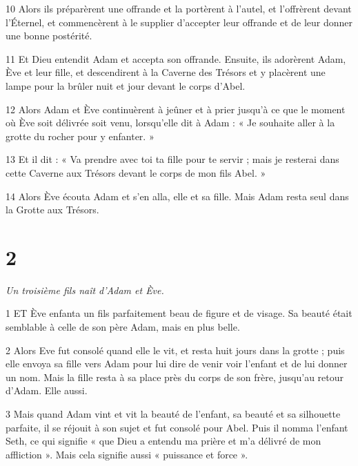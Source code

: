 \par 10 Alors ils préparèrent une offrande et la portèrent à l'autel, et l'offrèrent devant l'Éternel, et commencèrent à le supplier d'accepter leur offrande et de leur donner une bonne postérité.

\par 11 Et Dieu entendit Adam et accepta son offrande. Ensuite, ils adorèrent Adam, Ève et leur fille, et descendirent à la Caverne des Trésors et y placèrent une lampe pour la brûler nuit et jour devant le corps d'Abel.

\par 12 Alors Adam et Ève continuèrent à jeûner et à prier jusqu'à ce que le moment où Ève soit délivrée soit venu, lorsqu'elle dit à Adam : « Je souhaite aller à la grotte du rocher pour y enfanter. »

\par 13 Et il dit : « Va prendre avec toi ta fille pour te servir ; mais je resterai dans cette Caverne aux Trésors devant le corps de mon fils Abel. »

\par 14 Alors Ève écouta Adam et s'en alla, elle et sa fille. Mais Adam resta seul dans la Grotte aux Trésors.

\chapter{2}

\par \textit{Un troisième fils naît d'Adam et Ève.}

\par 1 ET Ève enfanta un fils parfaitement beau de figure et de visage. Sa beauté était semblable à celle de son père Adam, mais en plus belle.

\par 2 Alors Eve fut consolé quand elle le vit, et resta huit jours dans la grotte ; puis elle envoya sa fille vers Adam pour lui dire de venir voir l'enfant et de lui donner un nom. Mais la fille resta à sa place près du corps de son frère, jusqu'au retour d'Adam. Elle aussi.

\par 3 Mais quand Adam vint et vit la beauté de l'enfant, sa beauté et sa silhouette parfaite, il se réjouit à son sujet et fut consolé pour Abel. Puis il nomma l'enfant Seth, ce qui signifie « que Dieu a entendu ma prière et m'a délivré de mon affliction ». Mais cela signifie aussi « puissance et force ».

